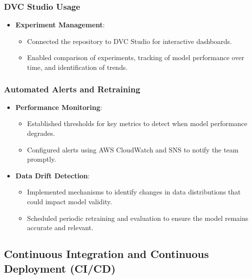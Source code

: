 \documentclass{article}
\begin{document}
\subsubsection{DVC Studio Usage}

\begin{itemize}[leftmargin=*]
    \item \textbf{Experiment Management}:
        \begin{itemize}[leftmargin=*]
            \item Connected the repository to DVC Studio for interactive dashboards.
            \item Enabled comparison of experiments, tracking of model performance over time, and identification of trends.
        \end{itemize}
\end{itemize}

\subsubsection{Automated Alerts and Retraining}

\begin{itemize}[leftmargin=*]
    \item \textbf{Performance Monitoring}:
        \begin{itemize}[leftmargin=*]
            \item Established thresholds for key metrics to detect when model performance degrades.
            \item Configured alerts using AWS CloudWatch and SNS to notify the team promptly.
        \end{itemize}
    \item \textbf{Data Drift Detection}:
        \begin{itemize}[leftmargin=*]
            \item Implemented mechanisms to identify changes in data distributions that could impact model validity.
            \item Scheduled periodic retraining and evaluation to ensure the model remains accurate and relevant.
        \end{itemize}
    \end{itemize}

\subsection{Continuous Integration and Continuous Deployment (CI/CD)}
\end{document}
